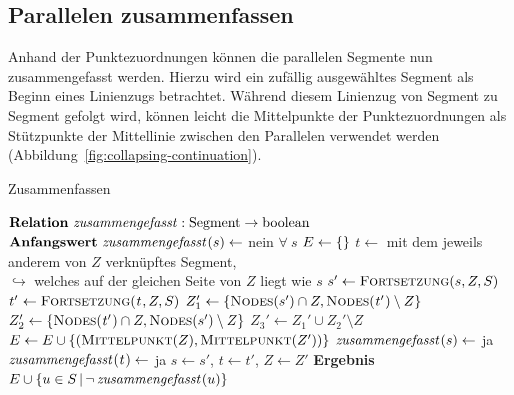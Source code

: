 \documentclass[../main/thesis.tex]{subfiles}
\begin{document}
\subsection{Parallelen zusammenfassen}
\label{ch:generalisation-algorithm}

Anhand der Punktezuordnungen können die parallelen Segmente nun zusammengefasst werden.
Hierzu wird ein zufällig ausgewähltes Segment als Beginn eines Linienzugs betrachtet.
Während diesem Linienzug von Segment zu Segment gefolgt wird, können leicht die Mittelpunkte der Punktezuordnungen als Stützpunkte der Mittellinie zwischen den Parallelen verwendet werden (Abbildung~\ref{fig:collapsing-continuation}).

\begin{algorithmhere}{Zusammenfassen}
\label{alg:Zusammenfassen}
\begin{algorithmic}
\State $\textbf{Relation}\ \relation{zusammengefasst} : \textrm{Segment} \rightarrow \textrm{boolean}$
\State $\textbf{Anfangswert}\ \relation{zusammengefasst}[s] \eqdefrel$ nein $\forall\ s$
	\State $E \gets \{\}$
			\State $t \gets$ mit dem jeweils anderem  von $Z$ verknüpftes Segment, \\\qquad\qquad\qquad\quad$\hookrightarrow$ welches auf der gleichen Seite von $Z$ liegt wie $s$
			\Repeat
				\State $s' \gets \textproc{Fortsetzung}(s,Z,S)$
				\State $\mathtowidth[s']{t'} \gets \textproc{Fortsetzung}(\mathtowidth[s]{t},Z,S)$
				\State $Z_1' \gets \Set{\textproc{Nodes}(s') \cap Z, \textproc{Nodes}(\mathtowidth[s']{t'}) \setminus Z}$
				\State $Z_2' \gets \Set{\textproc{Nodes}(\mathtowidth[s']{t'}) \cap Z, \textproc{Nodes}(s') \setminus Z}$
				\State $Z_3' \gets Z_1' \cup Z_2' \setminus Z $
					\State $E \gets E \cup \Set{(\textproc{Mittelpunkt}(Z), \textproc{Mittelpunkt}(Z'))}$
					\State $\relation{zusammengefasst}[s] \gets$ ja
					\State $\relation{zusammengefasst}[\mathtowidth[s]{t}] \gets$ ja
					\State $s \gets s'$, $t \gets t'$, $Z \gets Z'$ 
				\EndIf
		\EndFor
	\EndFor
	\State \textbf{Ergebnis} $E \cup \Set{u \in S \SetCond \neg\, \relation{zusammengefasst}[u]}$
\EndFunction
\end{algorithmic}
\end{algorithmhere}
\end{document}

